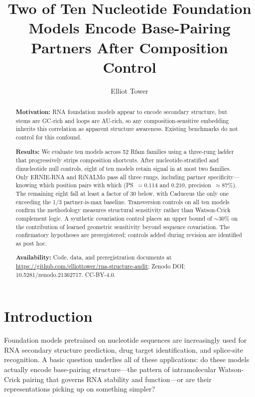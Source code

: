 \documentclass[11pt]{article}
\title{Two of Ten Nucleotide Foundation Models Encode Base-Pairing\\
Partners After Composition Control}
\author{Elliot Tower}
\affil{Independent researcher \\ \texttt{elliot@elliottower.ai}}
\date{}
\begin{document}
\maketitle

\begin{abstract}
\noindent\textbf{Motivation:}
RNA foundation models appear to encode secondary structure, but stems
are GC-rich and loops are AU-rich, so any composition-sensitive
embedding inherits this correlation as apparent structure awareness.
Existing benchmarks do not control for this confound.

\noindent\textbf{Results:}
We evaluate ten models across 52 Rfam families using a three-rung
ladder that progressively strips composition shortcuts. After
nucleotide-stratified and dinucleotide null controls, eight of ten
models retain signal in at most two families. Only ERNIE-RNA and
RiNALMo pass all three rungs, including partner specificity---knowing
which position pairs with which (PS~$= 0.114$ and $0.210$,
precision~$\approx 87\%$). The remaining eight fall at least a factor
of 30 below, with Caduceus the only one exceeding the 1/3
partner-is-max baseline. Transversion controls on all ten models confirm
the methodology measures structural sensitivity rather than
Watson-Crick complement logic. A synthetic covariation control places
an upper bound of $\sim$30\% on the contribution of learned geometric
sensitivity beyond sequence covariation. The confirmatory hypotheses are
preregistered; controls added during revision are identified as post hoc.

\noindent\textbf{Availability:}
Code, data, and preregistration documents at
\url{https://github.com/elliottower/rna-structure-audit}; Zenodo
DOI: 10.5281/zenodo.21362717. CC-BY-4.0.
\end{abstract}


\section{Introduction}

Foundation models pretrained on nucleotide sequences are increasingly
used for RNA secondary structure prediction, drug target
identification, and splice-site recognition. A basic question
underlies all of these applications: do these models actually
encode base-pairing structure---the pattern of intramolecular
Watson-Crick pairing that governs RNA stability and function---or
are their representations picking up on something simpler?
\end{document}

